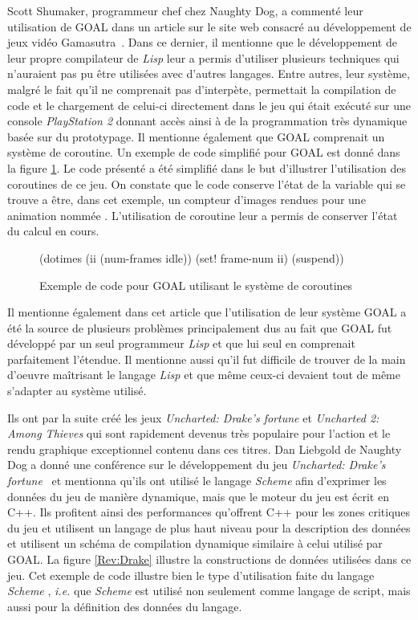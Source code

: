 \documentclass[12pt,twoside,letterpaper,francais]{book}
\newcommand{\ie}{{\textit{i.e. }}}
\newcommand{\lisp}{{\textit{Lisp }}}
\newcommand{\Schemelang}{{\textit{Scheme }}}
\newcommand{\scheme}[1]{\selectlanguage{english}{\tt #1}\selectlanguage{french}}
\begin{document}
Scott Shumaker, programmeur chef chez Naughty Dog, a commenté leur
utilisation de GOAL dans un article sur le site web consacré au
développement de jeux vidéo Gamasutra~\cite{ND_GOAL}. Dans ce dernier,
il mentionne que le développement de leur propre compilateur de \lisp
leur a permis d'utiliser plusieurs techniques qui n'auraient pas pu
être utilisées avec d'autres langages. Entre autres, leur système,
malgré le fait qu'il ne comprenait pas d'interpète, permettait la
compilation de code et le chargement de celui-ci directement dans le
jeu qui était exécuté sur une console \textit{PlayStation 2} donnant
accès ainsi à de la programmation très dynamique basée sur du
prototypage. Il mentionne également que GOAL comprenait un système de
coroutine. Un exemple de code simplifié pour GOAL est donné dans la
figure \ref{Rev:goal}. Le code présenté a été simplifié dans le but
d'illustrer l'utilisation des coroutines de ce jeu. On constate que le
code conserve l'état de la variable \scheme{ii} qui se trouve a être,
dans cet exemple, un compteur d'images rendues pour une animation
nommée \scheme{idle}. L'utilisation de coroutine leur a permis de
conserver l'état du calcul en cours.

\begin{figure}[htb!]
  \begin{schemecode}
(dotimes (ii (num-frames idle))
  (set! frame-num ii)
  (suspend))
  \end{schemecode}
  \caption{Exemple de code pour GOAL utilisant le système de coroutines}
  \label{Rev:goal}
\end{figure}

Il mentionne également dans cet article que l'utilisation de leur
système GOAL a été la source de plusieurs problèmes principalement dus
au fait que GOAL fut développé par un seul programmeur \lisp et que lui
seul en comprenait parfaitement l'étendue. Il mentionne aussi qu'il
fut difficile de trouver de la main d'oeuvre maîtrisant le langage
\lisp et que même ceux-ci devaient tout de même s'adapter au système
utilisé.

Ils ont par la suite créé les jeux \textit{Uncharted: Drake's fortune}
et \textit{Uncharted 2: Among Thieves} qui sont rapidement devenus
très populaire pour l'action et le rendu graphique exceptionnel
contenu dans ces titres. Dan Liebgold de Naughty Dog a donné une
conférence sur le développement du jeu \textit{Uncharted: Drake's
  fortune}~\cite{ND_DRAKE} et mentionna qu'ils ont utilisé le langage
\Schemelang afin d'exprimer les données du jeu de manière dynamique,
mais que le moteur du jeu est écrit en C++. Ils profitent ainsi des
performances qu'offrent C++ pour les zones critiques du jeu et
utilisent un langage de plus haut niveau pour la description des
données et utilisent un schéma de compilation dynamique similaire à
celui utilisé par GOAL. La figure \ref{Rev:Drake} illustre la
constructions de données utilisées dans ce jeu. Cet exemple de code
illustre bien le type d'utilisation faite du langage \Schemelang, \ie
que \Schemelang est utilisé non seulement comme langage de script,
mais aussi pour la définition des données du langage.
\end{document}
